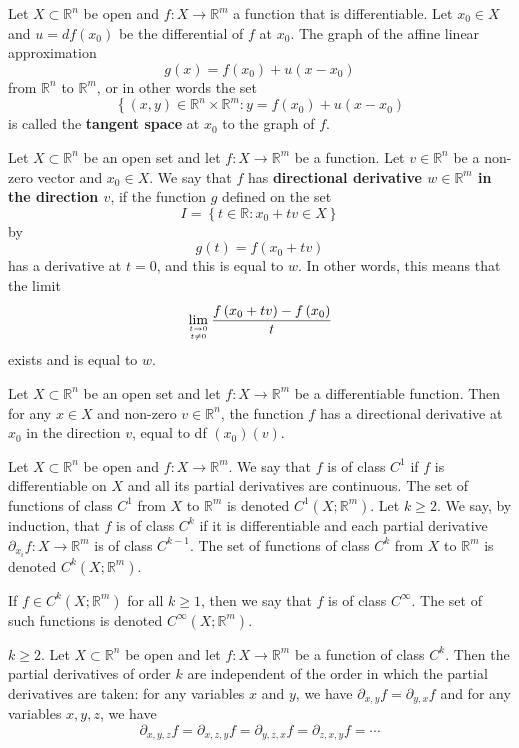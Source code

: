 \documentclass[10pt,landscape, a4paper]{article}
\newcommand{\custombox}[3]{\begin{tcolorbox}[left=0mm,right=0mm,bottom=0mm,top=0mm,title = \textbf{#1}, colback=#2!10!white, colframe = #2!70!white, coltitle=white, breakable]
    #3
    \end{tcolorbox}}
\newcommand{\definition}[2]{\custombox{Definition #1}{red}{#2}}
\newcommand{\prop}[2]{\custombox{Proposition #1}{black!50!orange!30!yellow}{#2}}
\newcommand{\R}{\mathbb{R}}
\newcommand{\Rn}{\R^n}
\newcommand{\Rm}{\R^m}
\begin{document}
\begin{multicols*}{3}
    \definition{3.4.11.}{Let $X \subset \Rn$ be open and $f: X \rightarrow \Rm$ a function that is differentiable. Let $x_{0} \in X$ and $u=d f\left(x_{0}\right)$ be the differential of $f$ at $x_{0}$. The graph of the affine linear approximation
        $$
            g(x)=f\left(x_{0}\right)+u\left(x-x_{0}\right)
        $$
        from $\Rn$ to $\Rm$, or in other words the set
        $$
            \left\{(x, y) \in \Rn \times \Rm: y=f\left(x_{0}\right)+u\left(x-x_{0}\right)\right.
        $$
        is called the \textbf{tangent space} at $x_{0}$ to the graph of $f$.}

    \definition{3.4.13.}{Let $X \subset \Rn$ be an open set and let $f: X \rightarrow \Rm$ be a function. Let $v \in \Rn$ be a non-zero vector and $x_{0} \in X$. We say that $f$ has \textbf{directional derivative $w \in \Rm$ in the direction $v$}, if the function $g$ defined on the set
        $$
            I=\left\{t \in \R: x_{0}+t v \in X\right\}
        $$
        by
        $$
            g(t)=f\left(x_{0}+t v\right)
        $$
        has a derivative at $t=0$, and this is equal to $w$.
        In other words, this means that the limit
        $$
            \lim _{t \rightarrow 0 \atop t \neq 0} \frac{f\left(x_{0}+t v\right)-f\left(x_{0}\right)}{t}
        $$
        exists and is equal to $w$.}


    \prop{3.4.15. }{Let $X \subset \Rn$ be an open set and let $f: X \rightarrow \Rm$ be a differentiable function. Then for any $x \in X$ and non-zero $v \in \Rn$, the function $f$ has a directional derivative at $x_{0}$ in the direction $v$, equal to df $\left(x_{0}\right)(v)$.}

    \definition{3.5.1.}{Let $X \subset \Rn$ be open and $f: X \rightarrow \Rm$.
        We say that $f$ is of class $C^{1}$ if $f$ is differentiable on $X$ and all its partial derivatives are continuous. The set of functions of class $C^{1}$ from $X$ to $\Rm$ is denoted $C^{1}\left(X ; \Rm\right)$.
        Let $k \geqslant 2$. We say, by induction, that $f$ is of class $C^{k}$ if it is differentiable and each partial derivative $\partial_{x_{i}} f: X \rightarrow \Rm$ is of class $C^{k-1}$. The set of functions of class $C^{k}$ from $X$ to $\Rm$ is denoted $C^{k}\left(X ; \Rm\right)$.

        If $f \in C^{k}\left(X ; \Rm\right)$ for all $k \geqslant 1$, then we say that $f$ is of class $C^{\infty}$. The set of such functions is denoted $C^{\infty}\left(X ; \Rm\right)$.}

    \prop{3.5.4 (Mixed derivatives commute)}{
        $k \geqslant 2$. Let $X \subset \Rn$ be open and let $f: X \rightarrow \R^{m}$ be a function of class $C^{k}$. Then the partial derivatives of order $k$ are independent of the order in which the partial derivatives are taken: for any variables $x$ and $y$, we have
        $
            \partial_{x, y} f=\partial_{y, x} f
        $
        and for any variables $x, y, z$, we have
        $$
            \partial_{x, y, z} f=\partial_{x, z, y} f=\partial_{y, z, x} f=\partial_{z, x, y} f=\cdots
        $$
    }


\end{multicols*}
\end{document}
